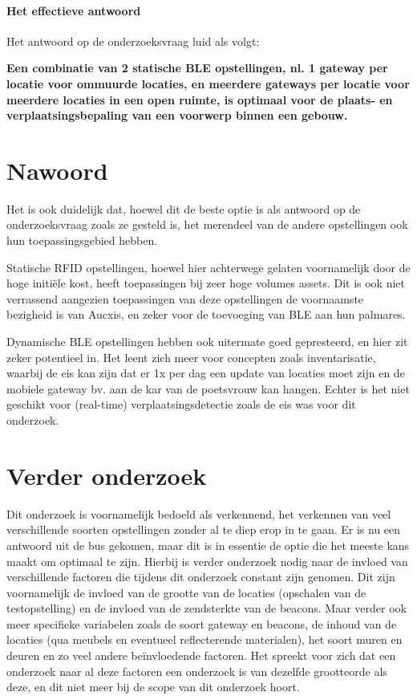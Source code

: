 \paragraph{Het effectieve antwoord}
Het antwoord op de onderzoeksvraag luid als volgt:
\begin{center}
	\textbf{Een combinatie van 2 statische BLE opstellingen, nl. 1 gateway per locatie voor ommuurde locaties, en meerdere gateways per locatie voor meerdere locaties in een open ruimte, is optimaal voor de plaats- en verplaatsingsbepaling van een voorwerp binnen een gebouw.}
\end{center}

\section{Nawoord}
Het is ook duidelijk dat, hoewel dit de beste optie is als antwoord op de onderzoeksvraag zoals ze gesteld is, het merendeel van de andere opstellingen ook hun toepassingsgebied hebben. 

Statische RFID opstellingen, hoewel hier achterwege gelaten voornamelijk door de hoge initiële kost, heeft toepassingen bij zeer hoge volumes assets. Dit is ook niet verrassend aangezien toepassingen van deze opstellingen de voornaamste bezigheid is van Aucxis, en zeker voor de toevoeging van BLE aan hun palmares. 

Dynamische BLE opstellingen hebben ook uitermate goed gepresteerd, en hier zit zeker potentieel in. Het leent zich meer voor concepten zoals inventarisatie, waarbij de eis kan zijn dat er 1x per dag een update van locaties moet zijn en de mobiele gateway bv. aan de kar van de poetsvrouw kan hangen. Echter is het niet geschikt voor (real-time) verplaatsingsdetectie zoals de eis was voor dit onderzoek.

\section{Verder onderzoek}
Dit onderzoek is voornamelijk bedoeld als verkennend, het verkennen van veel verschillende soorten opstellingen zonder al te diep erop in te gaan. Er is nu een antwoord uit de bus gekomen, maar dit is in essentie de optie die het meeste kans maakt om optimaal te zijn. Hierbij is verder onderzoek nodig naar de invloed van verschillende factoren die tijdens dit onderzoek constant zijn genomen. Dit zijn voornamelijk de invloed van de grootte van de locaties (opschalen van de testopstelling) en de invloed van de zendsterkte van de beacons. Maar verder ook meer specifieke variabelen zoals de soort gateway en beacons, de inhoud van de locaties (qua meubels en eventueel reflecterende materialen), het soort muren en deuren en zo veel andere beïnvloedende factoren. Het spreekt voor zich dat een onderzoek naar al deze factoren een onderzoek is van dezelfde grootteorde als deze, en dit niet meer bij de scope van dit onderzoek hoort.

